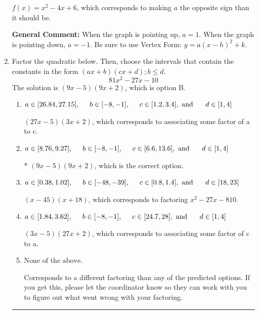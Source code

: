 \documentclass{extbook}[14pt]
\newcommand{\litem}[1]{\item #1

\rule{\textwidth}{0.4pt}}
\begin{document}
\begin{enumerate}
{\begin{enumerate}[label=\Alph*.]
$f(x)=x^{2} -4 x + 6$, which corresponds to making $a$ the opposite sign than it should be.
\end{enumerate}

\textbf{General Comment:} When the graph is pointing up, $a=1$. When the graph is pointing down, $a=-1$. Be sure to use Vertex Form: $y = a(x-h)^2+k$.
}
\litem{
Factor the quadratic below. Then, choose the intervals that contain the constants in the form $(ax+b)(cx+d); b \leq d.$
\[ 81x^{2} -27 x -10 \]The solution is \( (9x -5)(9x + 2) \), which is option B.\begin{enumerate}[label=\Alph*.]
\item \( a \in [26.84, 27.15], \hspace*{5mm} b \in [-8, -1], \hspace*{5mm} c \in [1.2, 3.4], \text{ and } \hspace*{5mm} d \in [1, 4] \)

 $(27x -5)(3x + 2)$, which corresponds to associating some factor of a to c.
\item \( a \in [8.76, 9.27], \hspace*{5mm} b \in [-8, -1], \hspace*{5mm} c \in [6.6, 13.6], \text{ and } \hspace*{5mm} d \in [1, 4] \)

* $(9x -5)(9x + 2)$, which is the correct option.
\item \( a \in [0.38, 1.02], \hspace*{5mm} b \in [-48, -39], \hspace*{5mm} c \in [0.8, 1.4], \text{ and } \hspace*{5mm} d \in [18, 23] \)

 $(x -45)(x + 18)$, which corresponds to factoring $x^{2} -27 x -810$.
\item \( a \in [1.84, 3.62], \hspace*{5mm} b \in [-8, -1], \hspace*{5mm} c \in [24.7, 28], \text{ and } \hspace*{5mm} d \in [1, 4] \)

 $(3x -5)(27x + 2)$, which corresponds to associating some factor of c to a.
\item \( \text{None of the above.} \)

 Corresponds to a different factoring than any of the predicted options. If you get this, please let the coordinator know so they can work with you to figure out what went wrong with your factoring.
\end{enumerate}

}
\end{enumerate}
\end{document}
